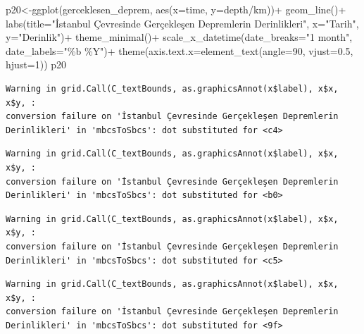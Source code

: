 \documentclass[
  11pt,
  a4paper,
  DIV=11,
  numbers=noendperiod]{scrartcl}
\newenvironment{Shaded}{\begin{snugshade}}{\end{snugshade}}
\newcommand{\AttributeTok}[1]{\textcolor[rgb]{0.40,0.45,0.13}{#1}}
\newcommand{\DecValTok}[1]{\textcolor[rgb]{0.68,0.00,0.00}{#1}}
\newcommand{\FloatTok}[1]{\textcolor[rgb]{0.68,0.00,0.00}{#1}}
\newcommand{\FunctionTok}[1]{\textcolor[rgb]{0.28,0.35,0.67}{#1}}
\newcommand{\NormalTok}[1]{\textcolor[rgb]{0.00,0.23,0.31}{#1}}
\newcommand{\OtherTok}[1]{\textcolor[rgb]{0.00,0.23,0.31}{#1}}
\newcommand{\SpecialCharTok}[1]{\textcolor[rgb]{0.37,0.37,0.37}{#1}}
\newcommand{\StringTok}[1]{\textcolor[rgb]{0.13,0.47,0.30}{#1}}
\begin{document}
\begin{Shaded}
\begin{Highlighting}[]
\NormalTok{p20}\OtherTok{\textless{}{-}}\FunctionTok{ggplot}\NormalTok{(gerceklesen\_deprem, }\FunctionTok{aes}\NormalTok{(}\AttributeTok{x=}\NormalTok{time, }\AttributeTok{y=}\StringTok{\textasciigrave{}}\AttributeTok{depth/km}\StringTok{\textasciigrave{}}\NormalTok{))}\SpecialCharTok{+}
  \FunctionTok{geom\_line}\NormalTok{()}\SpecialCharTok{+}
  \FunctionTok{labs}\NormalTok{(}\AttributeTok{title=}\StringTok{"İstanbul Çevresinde Gerçekleşen Depremlerin Derinlikleri"}\NormalTok{, }\AttributeTok{x=}\StringTok{"Tarih"}\NormalTok{, }\AttributeTok{y=}\StringTok{"Derinlik"}\NormalTok{)}\SpecialCharTok{+}
  \FunctionTok{theme\_minimal}\NormalTok{()}\SpecialCharTok{+}
  \FunctionTok{scale\_x\_datetime}\NormalTok{(}\AttributeTok{date\_breaks=}\StringTok{"1 month"}\NormalTok{, }\AttributeTok{date\_labels=}\StringTok{"\%b \%Y"}\NormalTok{)}\SpecialCharTok{+}
  \FunctionTok{theme}\NormalTok{(}\AttributeTok{axis.text.x=}\FunctionTok{element\_text}\NormalTok{(}\AttributeTok{angle=}\DecValTok{90}\NormalTok{, }\AttributeTok{vjust=}\FloatTok{0.5}\NormalTok{, }\AttributeTok{hjust=}\DecValTok{1}\NormalTok{))}
\NormalTok{p20}
\end{Highlighting}
\end{Shaded}

\begin{verbatim}
Warning in grid.Call(C_textBounds, as.graphicsAnnot(x$label), x$x, x$y, :
conversion failure on 'İstanbul Çevresinde Gerçekleşen Depremlerin
Derinlikleri' in 'mbcsToSbcs': dot substituted for <c4>
\end{verbatim}

\begin{verbatim}
Warning in grid.Call(C_textBounds, as.graphicsAnnot(x$label), x$x, x$y, :
conversion failure on 'İstanbul Çevresinde Gerçekleşen Depremlerin
Derinlikleri' in 'mbcsToSbcs': dot substituted for <b0>
\end{verbatim}

\begin{verbatim}
Warning in grid.Call(C_textBounds, as.graphicsAnnot(x$label), x$x, x$y, :
conversion failure on 'İstanbul Çevresinde Gerçekleşen Depremlerin
Derinlikleri' in 'mbcsToSbcs': dot substituted for <c5>
\end{verbatim}

\begin{verbatim}
Warning in grid.Call(C_textBounds, as.graphicsAnnot(x$label), x$x, x$y, :
conversion failure on 'İstanbul Çevresinde Gerçekleşen Depremlerin
Derinlikleri' in 'mbcsToSbcs': dot substituted for <9f>
\end{verbatim}
\end{document}
